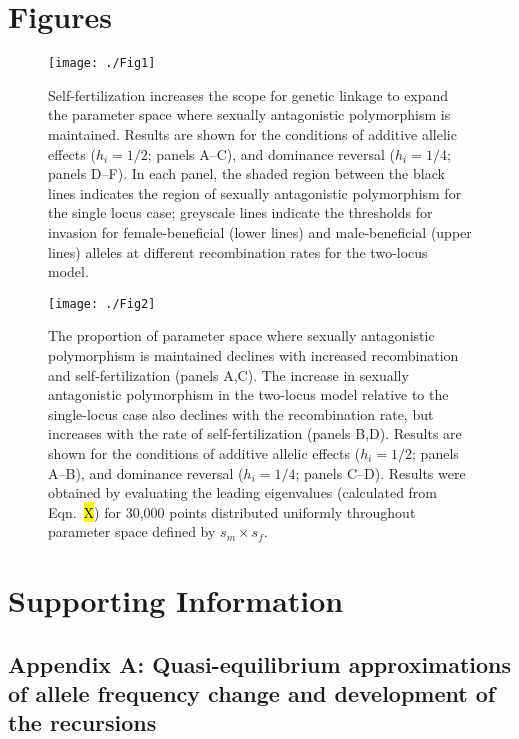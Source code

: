 \documentclass{article}
\begin{document}
\newpage{}

\section*{Figures}
 
\begin{figure}[!ht]
\texttt{[image: ./Fig1]}
\caption{Self-fertilization increases the scope for genetic linkage to expand the parameter space where sexually antagonistic polymorphism is maintained. Results are shown for the conditions of additive allelic effects ($h_i = 1/2$; panels A--C), and dominance reversal ($h_i = 1/4$; panels D--F). In each panel, the shaded region between the black lines indicates the region of sexually antagonistic polymorphism for the single locus case; greyscale lines indicate the thresholds for invasion for female-beneficial (lower lines) and male-beneficial (upper lines) alleles at different recombination rates for the two-locus model.}
\label{Fig:Fig1.pdf}
\end{figure}
\newpage{}


\begin{figure}[!ht]
\texttt{[image: ./Fig2]}
\caption{The proportion of parameter space where sexually antagonistic polymorphism is maintained declines with increased recombination and self-fertilization (panels A,C). The increase in sexually antagonistic polymorphism in the two-locus model relative to the single-locus case also declines with the recombination rate, but increases with the rate of self-fertilization (panels B,D). Results are shown for the conditions of additive allelic effects ($h_i = 1/2$; panels A--B), and dominance reversal ($h_i = 1/4$; panels C--D). Results were obtained by evaluating the leading eigenvalues (calculated from Eqn.~\hl{X}) for 30,000 points distributed uniformly throughout parameter space defined by $s_m \times s_f$.}
\label{Fig:Fig2.pdf}
\end{figure}
\newpage{}




\section*{Supporting Information}

\subsection*{Appendix A: Quasi-equilibrium approximations of allele frequency change and development of the recursions}
\renewcommand{\theequation}{A\arabic{equation}}
\end{document}
